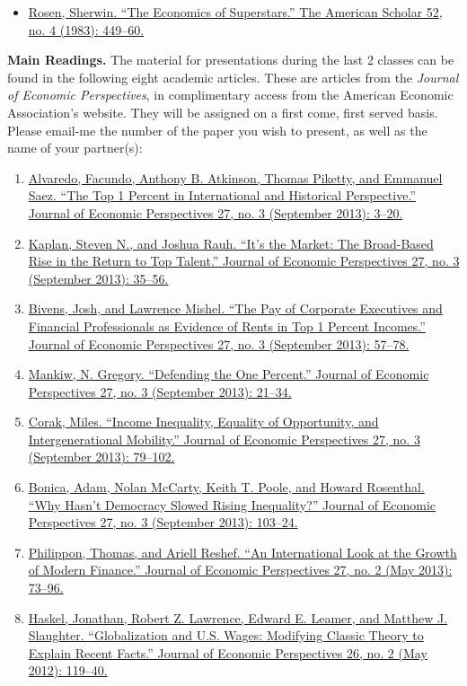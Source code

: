 \documentclass[]{book}
\providecommand{\tightlist}{%
  \setlength{\itemsep}{0pt}\setlength{\parskip}{0pt}}
\theoremstyle{definition}
\theoremstyle{definition}
\theoremstyle{definition}
\theoremstyle{remark}
\begin{document}
\begin{itemize}
\tightlist
\item
  \href{https://www.jstor.org/stable/41210977}{Rosen, Sherwin. ``The
  Economics of Superstars.'' The American Scholar 52, no. 4 (1983):
  449--60.}
\end{itemize}

\textbf{Main Readings.} The material for presentations during the last 2
classes can be found in the following eight academic articles. These are
articles from the \emph{Journal of Economic Perspectives}, in
complimentary access from the American Economic Association's website.
They will be assigned on a first come, first served basis. Please
email-me the number of the paper you wish to present, as well as the
name of your partner(s):

\begin{enumerate}
\def\labelenumi{\arabic{enumi}.}
\tightlist
\item
  \href{https://doi.org/10.1257/jep.27.3.3}{Alvaredo, Facundo, Anthony
  B. Atkinson, Thomas Piketty, and Emmanuel Saez. ``The Top 1 Percent in
  International and Historical Perspective.'' Journal of Economic
  Perspectives 27, no. 3 (September 2013): 3--20.}
\item
  \href{https://doi.org/10.1257/jep.27.3.35}{Kaplan, Steven N., and
  Joshua Rauh. ``It's the Market: The Broad-Based Rise in the Return to
  Top Talent.'' Journal of Economic Perspectives 27, no. 3 (September
  2013): 35--56.}
\item
  \href{https://doi.org/10.1257/jep.27.3.57}{Bivens, Josh, and Lawrence
  Mishel. ``The Pay of Corporate Executives and Financial Professionals
  as Evidence of Rents in Top 1 Percent Incomes.'' Journal of Economic
  Perspectives 27, no. 3 (September 2013): 57--78.}
\item
  \href{https://doi.org/10.1257/jep.27.3.21}{Mankiw, N. Gregory.
  ``Defending the One Percent.'' Journal of Economic Perspectives 27,
  no. 3 (September 2013): 21--34.}
\item
  \href{https://doi.org/10.1257/jep.27.3.79}{Corak, Miles. ``Income
  Inequality, Equality of Opportunity, and Intergenerational Mobility.''
  Journal of Economic Perspectives 27, no. 3 (September 2013): 79--102.}
\item
  \href{https://doi.org/10.1257/jep.27.3.103}{Bonica, Adam, Nolan
  McCarty, Keith T. Poole, and Howard Rosenthal. ``Why Hasn't Democracy
  Slowed Rising Inequality?'' Journal of Economic Perspectives 27, no. 3
  (September 2013): 103--24.}
\item
  \href{https://doi.org/10.1257/jep.27.2.73}{Philippon, Thomas, and
  Ariell Reshef. ``An International Look at the Growth of Modern
  Finance.'' Journal of Economic Perspectives 27, no. 2 (May 2013):
  73--96.}
\item
  \href{https://doi.org/10.1257/jep.26.2.119}{Haskel, Jonathan, Robert
  Z. Lawrence, Edward E. Leamer, and Matthew J. Slaughter.
  ``Globalization and U.S. Wages: Modifying Classic Theory to Explain
  Recent Facts.'' Journal of Economic Perspectives 26, no. 2 (May 2012):
  119--40.}
\end{enumerate}
\end{document}
